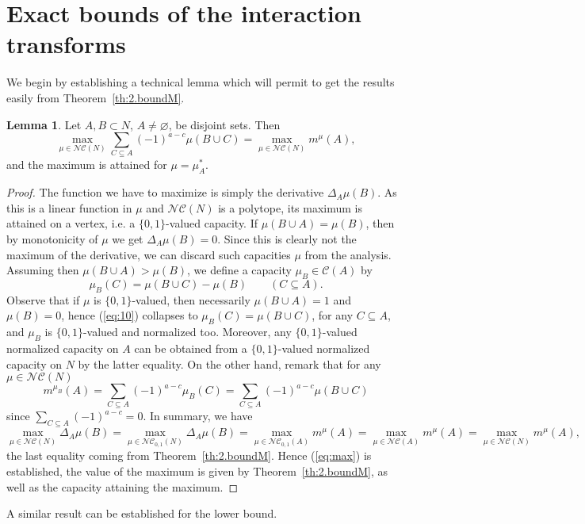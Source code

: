 \documentclass[12pt,a4paper]{article}
\theoremstyle{definition}
\newtheorem{lemma}{Lemma}
\theoremstyle{remark}
\def \C {\mathscr{C}}
\def \NC {\mathscr{NC}}
\begin{document}
\section{Exact bounds of the interaction transforms}
We begin by establishing a technical lemma which will permit to get the results
easily from Theorem~\ref{th:2.boundM}.
\begin{lemma}\label{lem:1}
Let $A,B\subset N$, $A\neq\varnothing$, be disjoint sets. Then
\begin{equation}\label{eq:max}
\max_{\mu\in\NC(N)}\sum_{C\subseteq A}(-1)^{a-c}\mu(B\cup C) = \max_{\mu\in\NC(N)}m^\mu(A),
\end{equation}
and the maximum is attained for $\mu=\mu_A^*$.
\end{lemma}
\begin{proof}
The function we have to maximize is simply the derivative $\Delta_A\mu(B)$.  As
this is a linear function in $\mu$ and $\NC(N)$ is a polytope, its maximum is
attained on a vertex, i.e. a $\{ 0, 1\} $-valued capacity. If $\mu(B\cup
A)=\mu(B)$, then by monotonicity of $\mu$ we get $\Delta_A\mu(B)=0$. Since this
is clearly not the maximum of the derivative, we can discard such capacities
$\mu$ from the analysis. Assuming then $\mu(B\cup A) >\mu(B)$, we define a
capacity $\mu_B\in\C(A)$ by
\begin{equation}\label{eq:10}
\mu_B(C) = \mu(B\cup C) - \mu(B) \qquad (C\subseteq A).
\end{equation}
Observe that if $\mu$ is $\{0,1\}$-valued, then necessarily $\mu(B\cup
  A)=1$ and $\mu(B)=0$, hence (\ref{eq:10}) collapses to $\mu_B(C) = \mu(B\cup
  C)$, for any $C\subseteq A$, and $\mu_B$ is $\{0,1\}$-valued and normalized too.
Moreover, any $\{0,1\}$-valued normalized capacity on $A$ can be obtained from a
$\{0,1\}$-valued normalized capacity on $N$ by the latter equality. 
  On the other hand, remark that for any $\mu\in \NC(N)$
\[
m^{\mu_B}(A) = \sum_{C\subseteq A}(-1)^{a-c}\mu_B(C) = \sum_{C\subseteq A}(-1)^{a-c}\mu(B\cup C)
\]
since $\sum_{C\subseteq A}(-1)^{a-c}=0$. In summary, we have
\[
\max_{\mu\in\NC(N)}\Delta_A\mu(B)=\max_{\mu\in\NC_{0,1}(N)}\Delta_A\mu(B) =
\max_{\mu\in\NC_{0,1}(A)}m^{\mu}(A) = \max_{\mu\in\NC(A)}m^{\mu}(A) = \max_{\mu\in\NC(N)}m^{\mu}(A),
\]
the last equality coming from Theorem~\ref{th:2.boundM}. Hence
(\ref{eq:max}) is established, the value of the maximum is given by
Theorem~\ref{th:2.boundM}, as well as the capacity attaining the maximum.
\end{proof}
A similar result can be established for the lower bound.
\end{document}
